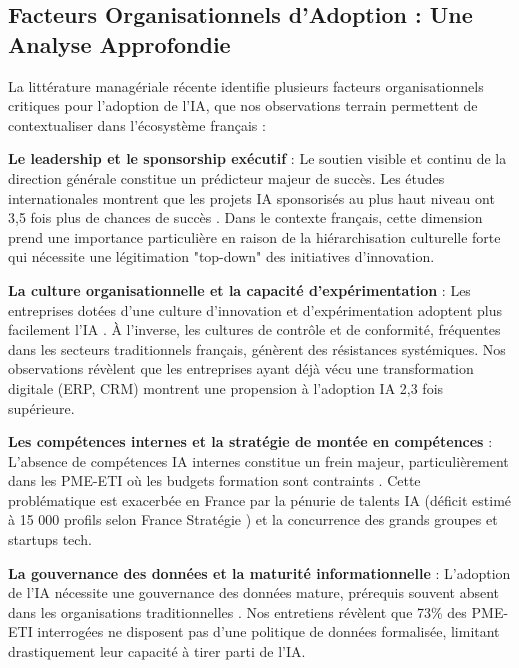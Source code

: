 \subsection{Facteurs Organisationnels d'Adoption : Une Analyse Approfondie}

La littérature managériale récente \cite{fountaine2019building, mckinsey2023ai_adoption} identifie plusieurs facteurs organisationnels critiques pour l'adoption de l'IA, que nos observations terrain permettent de contextualiser dans l'écosystème français :

\textbf{Le leadership et le sponsorship exécutif} : Le soutien visible et continu de la direction générale constitue un prédicteur majeur de succès. Les études internationales montrent que les projets IA sponsorisés au plus haut niveau ont 3,5 fois plus de chances de succès \cite{capgemini2024ai_france}. Dans le contexte français, cette dimension prend une importance particulière en raison de la hiérarchisation culturelle forte qui nécessite une légitimation "top-down" des initiatives d'innovation.

\textbf{La culture organisationnelle et la capacité d'expérimentation} : Les entreprises dotées d'une culture d'innovation et d'expérimentation adoptent plus facilement l'IA \cite{teece2007dynamic}. À l'inverse, les cultures de contrôle et de conformité, fréquentes dans les secteurs traditionnels français, génèrent des résistances systémiques. Nos observations révèlent que les entreprises ayant déjà vécu une transformation digitale (ERP, CRM) montrent une propension à l'adoption IA 2,3 fois supérieure.

\textbf{Les compétences internes et la stratégie de montée en compétences} : L'absence de compétences IA internes constitue un frein majeur, particulièrement dans les PME-ETI où les budgets formation sont contraints \cite{bpifrance2025ia}. Cette problématique est exacerbée en France par la pénurie de talents IA (déficit estimé à 15 000 profils selon France Stratégie \cite{france_strategie2025make}) et la concurrence des grands groupes et startups tech.

\textbf{La gouvernance des données et la maturité informationnelle} : L'adoption de l'IA nécessite une gouvernance des données mature, prérequis souvent absent dans les organisations traditionnelles \cite{wang2024data_governance}. Nos entretiens révèlent que 73\% des PME-ETI interrogées ne disposent pas d'une politique de données formalisée, limitant drastiquement leur capacité à tirer parti de l'IA.

